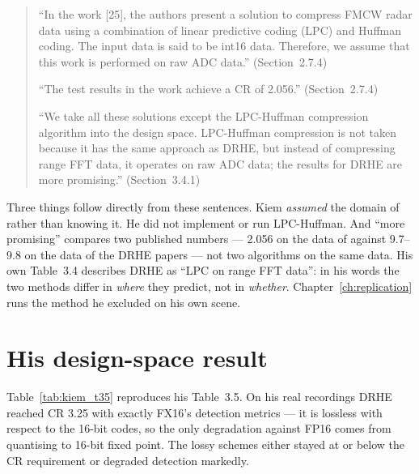 \begin{quote}\small
``In the work [25], the authors present a solution to compress FMCW radar data
using a combination of linear predictive coding (LPC) and Huffman coding. The
input data is said to be int16 data. Therefore, we assume that this work is
performed on raw ADC data.'' (Section~2.7.4)

``The test results in the work achieve a CR of 2.056.'' (Section~2.7.4)

``We take all these solutions except the LPC-Huffman compression algorithm into
the design space. LPC-Huffman compression is not taken because it has the same
approach as DRHE, but instead of compressing range FFT data, it operates on raw
ADC data; the results for DRHE are more promising.'' (Section~3.4.1)
\end{quote}

\noindent
Three things follow directly from these sentences. Kiem \emph{assumed} the
domain of \cite{meucci2022} rather than knowing it. He did not implement or run LPC-Huffman.
And ``more promising'' compares two published numbers --- 2.056 on the data of
\cite{meucci2022} against 9.7--9.8 on the data of the DRHE papers --- not two algorithms on
the same data. His own Table~3.4 describes DRHE as ``LPC on range FFT data'':
in his words the two methods differ in \emph{where} they predict, not in
\emph{whether}. Chapter~\ref{ch:replication} runs the method he excluded on
his own scene.

\section{His design-space result}
\label{sec:kiem_dse}

Table~\ref{tab:kiem_t35} reproduces his Table~3.5. On his real recordings DRHE
reached CR \num{3.25} with exactly FX16's detection metrics --- it is lossless
with respect to the 16-bit codes, so the only degradation against FP16 comes
from quantising to 16-bit fixed point. The lossy schemes either stayed at or
below the CR requirement or degraded detection markedly.

